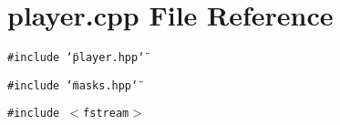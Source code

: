 \section{player.cpp File Reference}
\label{player_8cpp}
{\tt \#include \char`\"{}player.hpp\char`\"{}}\par
{\tt \#include \char`\"{}masks.hpp\char`\"{}}\par
{\tt \#include $<$fstream$>$}\par
